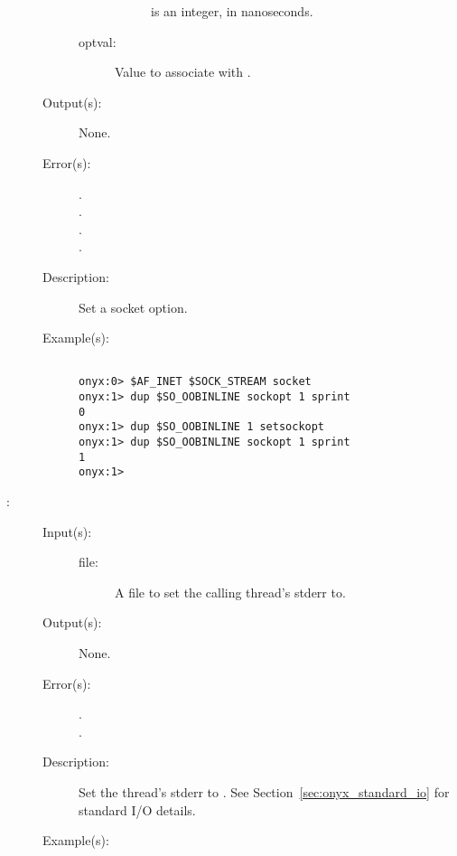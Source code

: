 \begin{description}
\begin{description}
\begin{description}
\begin{description}
				 is an integer, in nanoseconds.
			\end{description}
		\item[optval: ]
			Value to associate with .
		\end{description}
	\item[Output(s): ] None.
	\item[Error(s): ]
		\begin{description}\item[]
		\item[.]
		\item[.]
		\item[.]
		\item[.]
		\end{description}
	\item[Description: ]
		Set a socket option.
	\item[Example(s): ]\begin{verbatim}

onyx:0> $AF_INET $SOCK_STREAM socket
onyx:1> dup $SO_OOBINLINE sockopt 1 sprint
0
onyx:1> dup $SO_OOBINLINE 1 setsockopt
onyx:1> dup $SO_OOBINLINE sockopt 1 sprint
1
onyx:1>
		\end{verbatim}
	\end{description}
\label{systemdict:setstderr}
\item[{\onyxop{file}{setstderr}{--}}: ]
	\begin{description}\item[]
	\item[Input(s): ]
		\begin{description}\item[]
		\item[file: ]
			A file to set the calling thread's stderr to.
		\end{description}
	\item[Output(s): ] None.
	\item[Error(s): ]
		\begin{description}\item[]
		\item[.]
		\item[.]
		\end{description}
	\item[Description: ]
		Set the thread's stderr to .  See
		Section~\ref{sec:onyx_standard_io} for standard I/O details.
	\item[Example(s): ]\begin{verbatim}


\end{verbatim}
\end{description}
\end{description}
